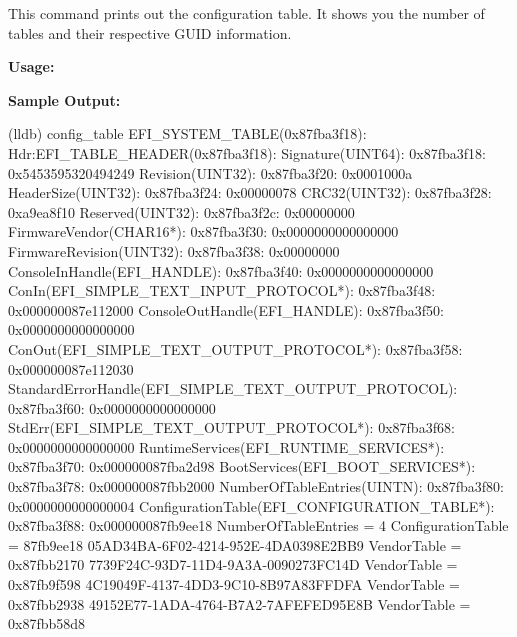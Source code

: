 This command prints out the configuration table. It shows you the number
of tables and their respective GUID information.

\textcolor{SmokeyDarkBlue}{\bfseries Usage:} 

\textcolor{SmokeyDarkBlue}{\bfseries Sample Output:} \\
\begin{TerminalOutput}
(lldb) config_table
EFI_SYSTEM_TABLE(0x87fba3f18):
	Hdr:EFI_TABLE_HEADER(0x87fba3f18):
		Signature(UINT64):
			0x87fba3f18: 0x5453595320494249
		Revision(UINT32):
			0x87fba3f20: 0x0001000a
		HeaderSize(UINT32):
			0x87fba3f24: 0x00000078
		CRC32(UINT32):
			0x87fba3f28: 0xa9ea8f10
		Reserved(UINT32):
			0x87fba3f2c: 0x00000000
	FirmwareVendor(CHAR16*):
		0x87fba3f30: 0x0000000000000000
	FirmwareRevision(UINT32):
		0x87fba3f38: 0x00000000
	ConsoleInHandle(EFI_HANDLE):
		0x87fba3f40: 0x0000000000000000
	ConIn(EFI_SIMPLE_TEXT_INPUT_PROTOCOL*):
		0x87fba3f48: 0x000000087e112000
	ConsoleOutHandle(EFI_HANDLE):
		0x87fba3f50: 0x0000000000000000
	ConOut(EFI_SIMPLE_TEXT_OUTPUT_PROTOCOL*):
		0x87fba3f58: 0x000000087e112030
	StandardErrorHandle(EFI_SIMPLE_TEXT_OUTPUT_PROTOCOL):
		0x87fba3f60: 0x0000000000000000
	StdErr(EFI_SIMPLE_TEXT_OUTPUT_PROTOCOL*):
		0x87fba3f68: 0x0000000000000000
	RuntimeServices(EFI_RUNTIME_SERVICES*):
		0x87fba3f70: 0x000000087fba2d98
	BootServices(EFI_BOOT_SERVICES*):
		0x87fba3f78: 0x000000087fbb2000
	NumberOfTableEntries(UINTN):
		0x87fba3f80: 0x0000000000000004
	ConfigurationTable(EFI_CONFIGURATION_TABLE*):
		0x87fba3f88: 0x000000087fb9ee18
NumberOfTableEntries = 4
ConfigurationTable = 87fb9ee18
05AD34BA-6F02-4214-952E-4DA0398E2BB9  VendorTable = 0x87fbb2170
7739F24C-93D7-11D4-9A3A-0090273FC14D  VendorTable = 0x87fb9f598
4C19049F-4137-4DD3-9C10-8B97A83FFDFA  VendorTable = 0x87fbb2938
49152E77-1ADA-4764-B7A2-7AFEFED95E8B  VendorTable = 0x87fbb58d8
\end{TerminalOutput}

